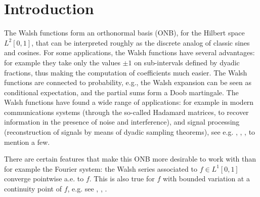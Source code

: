 \documentclass[11pt]{amsart}
\theoremstyle{definition}
\theoremstyle{remark}
\numberwithin{equation}{section}
\begin{document}
\section{Introduction}

The Walsh  functions form an orthonormal basis (ONB), for the Hilbert space $L^2[0,1]$,  that can be interpreted roughly as the discrete analog of classic sines and cosines. For some applications, the Walsh functions have several advantages: for example they take only the values $\pm 1$ on sub-intervals defined by dyadic fractions, thus making the computation of coefficients much easier. The Walsh functions  are connected to probability, e.g., the Walsh expansion can be seen as conditional expectation, and the partial sums form a Doob martingale.
The Walsh functions have found a wide range of applications: for example in modern communications systems (through the so-called Hadamard matrices, to recover information in the presence of noise and interference), and signal processing (reconstruction of signals by means of dyadic sampling theorems), see e.g. \cite{ARa}, \cite{Corr}, \cite{Hart}, \cite{Yuen} to mention a few. 

There are certain features that make this ONB more desirable to work with than for example the Fourier system: the Walsh series associated to $f\in L^1[0,1]$ converge pointwise a.e. to $f$. This is also true for $f$ with bounded variation at a continuity point of $f$, e.g. see \cite{Walsh}, \cite{Paley}, \cite{Nagy}. 
\end{document}
